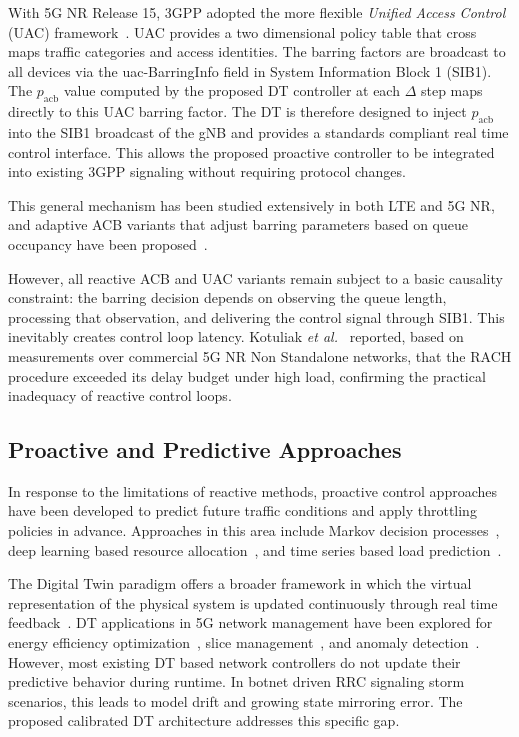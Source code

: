 \documentclass[conference]{IEEEtran}
\newcommand{\pacb}{p_{\mathrm{acb}}}
\begin{document}
With 5G NR Release 15, 3GPP adopted the more flexible \emph{Unified Access Control} (UAC) framework~\cite{b4}. UAC provides a two dimensional policy table that cross maps traffic categories and access identities. The barring factors are broadcast to all devices via the uac-BarringInfo field in System Information Block 1 (SIB1). The $\pacb$ value computed by the proposed DT controller at each $\Delta$ step maps directly to this UAC barring factor. The DT is therefore designed to inject $\pacb$ into the SIB1 broadcast of the gNB and provides a standards compliant real time control interface. This allows the proposed proactive controller to be integrated into existing 3GPP signaling without requiring protocol changes.

This general mechanism has been studied extensively in both LTE and 5G NR, and adaptive ACB variants that adjust barring parameters based on queue occupancy have been proposed~\cite{b5}.

However, all reactive ACB and UAC variants remain subject to a basic causality constraint: the barring decision depends on observing the queue length, processing that observation, and delivering the control signal through SIB1. This inevitably creates control loop latency. Kotuliak \emph{et al.}~\cite{b6} reported, based on measurements over commercial 5G NR Non Standalone networks, that the RACH procedure exceeded its delay budget under high load, confirming the practical inadequacy of reactive control loops.

\subsection{Proactive and Predictive Approaches}

In response to the limitations of reactive methods, proactive control approaches have been developed to predict future traffic conditions and apply throttling policies in advance. Approaches in this area include Markov decision processes~\cite{b7}, deep learning based resource allocation~\cite{b8}, and time series based load prediction~\cite{b9}.

The Digital Twin paradigm offers a broader framework in which the virtual representation of the physical system is updated continuously through real time feedback~\cite{b10}. DT applications in 5G network management have been explored for energy efficiency optimization~\cite{b11}, slice management~\cite{b12}, and anomaly detection~\cite{b13}. However, most existing DT based network controllers do not update their predictive behavior during runtime. In botnet driven RRC signaling storm scenarios, this leads to model drift and growing state mirroring error. The proposed calibrated DT architecture addresses this specific gap.
\end{document}
